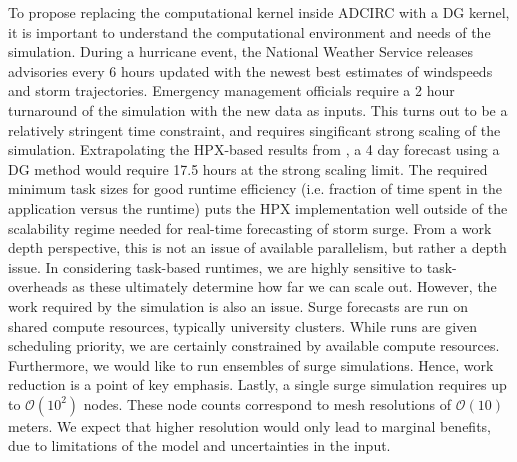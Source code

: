 To propose replacing the computational kernel inside ADCIRC with a DG kernel, it is important to understand the computational environment and needs of the simulation. During a hurricane event, the National Weather Service releases advisories every 6 hours updated with the newest best estimates of windspeeds and storm trajectories. Emergency management officials require a 2 hour turnaround of the simulation with the new data as inputs. This turns out to be a relatively stringent time constraint, and requires singificant strong scaling of the simulation. Extrapolating the HPX-based results from \cite{Bremer2019}, a 4 day forecast using a DG method would require 17.5 hours at the strong scaling limit.  The required minimum task sizes for good runtime efficiency (i.e. fraction of time spent in the application versus the runtime) puts the HPX implementation well outside of the scalability regime needed for real-time forecasting of storm surge. 
From a work depth perspective, this is not an issue of available parallelism, but rather a depth issue. In considering task-based runtimes, we are highly sensitive to task-overheads as these ultimately determine how far we can scale out.
 However, the work required by the simulation is also an issue. Surge forecasts are run on shared compute resources, typically university clusters. While runs are given scheduling priority, we are certainly constrained by available compute resources. Furthermore, we would like to run ensembles of surge simulations. Hence, work reduction is a point of key emphasis.
 Lastly, a single surge simulation requires up to $\mathcal{O}(10^2)$ nodes. These node counts correspond to mesh resolutions of $\mathcal{O}(10)$ meters. We expect that higher resolution would only lead to marginal benefits, due to limitations of the model and uncertainties in the input. 


